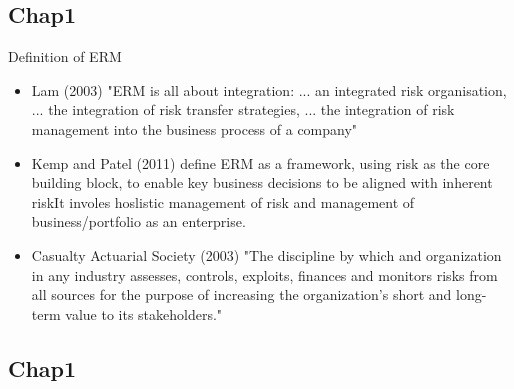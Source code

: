 \documentclass[aspectratio=169, 10pt]{beamer} %
\begin{document}
\subsection{Chap1}
\begin{frame}{Definition of ERM}

    \begin{itemize}

                 \item [$\bullet$] Lam (2003) "ERM is all about integration: ... an integrated risk organisation, ... the integration 
                 of risk transfer strategies, ... the integration of risk management into the business process of a company"
          \medskip 
          \item [$\bullet$] Kemp and Patel (2011) define ERM as a framework, using risk as the core building block, to enable key business decisions 
          to be aligned with inherent riskIt involes hoslistic management of risk and management of business/portfolio as an enterprise. 
           \medskip 
          \item [$\bullet$] Casualty Actuarial Society (2003) "The discipline by which and organization in any industry assesses, controls, 
          exploits, finances and monitors risks from all sources for the purpose of increasing the organization's short and long-term value to its stakeholders."  
          \medskip 
\end{itemize}

\end{frame}



\subsection{Chap1}
\end{document}
